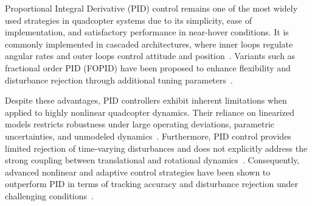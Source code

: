


\noindent Proportional Integral Derivative (PID) control remains one of the most widely used strategies in quadcopter systems due to its simplicity, ease of implementation, and satisfactory performance in near-hover conditions. It is commonly implemented in cascaded architectures, where inner loops regulate angular rates and outer loops control attitude and position~\cite{samy2024robust,labbadi2020novel}. Variants such as fractional order PID (FOPID) have been proposed to enhance flexibility and disturbance rejection through additional tuning parameters~\cite{abro2025swarm}. 

Despite these advantages, PID controllers exhibit inherent limitations when applied to highly nonlinear quadcopter dynamics. Their reliance on linearized models restricts robustness under large operating deviations, parametric uncertainties, and unmodeled dynamics~\cite{samy2024robust}. Furthermore, PID control provides limited rejection of time-varying disturbances and does not explicitly address the strong coupling between translational and rotational dynamics~\cite{labbadi2020novel,mofid2020adaptive}. Consequently, advanced nonlinear and adaptive control strategies have been shown to outperform PID in terms of tracking accuracy and disturbance rejection under challenging conditions~\cite{wang2023robust,pan2021robust}.\\

